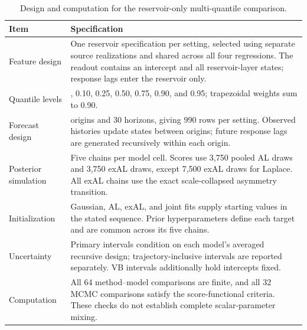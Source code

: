 \begin{table}[!htbp]
\centering
\small
\setlength{\tabcolsep}{3pt}
\renewcommand{\arraystretch}{1.08}
\begin{tabular}{@{}>{\raggedright\arraybackslash}p{}>{\raggedright\arraybackslash}p{}@{}}
\toprule
Item & Specification \\
\midrule
Feature design & One reservoir specification per setting, selected using separate source realizations and shared across all four regressions. The readout contains an intercept and all reservoir-layer states; response lags enter the reservoir only. \\
Quantile levels & 0.05, 0.10, 0.25, 0.50, 0.75, 0.90, and 0.95; trapezoidal weights sum to 0.90. \\
Forecast design & 33 origins and 30 horizons, giving 990 rows per setting. Observed histories update states between origins; future response lags are generated recursively within each origin. \\
Posterior simulation & Five chains per model cell. Scores use 3,750 pooled AL draws and 3,750 exAL draws, except 7,500 exAL draws for Laplace. All exAL chains use the exact scale-collapsed asymmetry transition. \\
Initialization & Gaussian, AL, exAL, and joint fits supply starting values in the stated sequence. Prior hyperparameters define each target and are common across its five chains. \\
Uncertainty & Primary intervals condition on each model's averaged recursive design; trajectory-inclusive intervals are reported separately. VB intervals additionally hold intercepts fixed. \\
Computation & All 64 method--model comparisons are finite, and all 32 MCMC comparisons satisfy the score-functional criteria. These checks do not establish complete scalar-parameter mixing. \\
\bottomrule
\end{tabular}
\caption{Design and computation for the reservoir-only multi-quantile comparison.}
\label{tab:joint-qdesn-pure-desn-v2-protocol}
\end{table}
